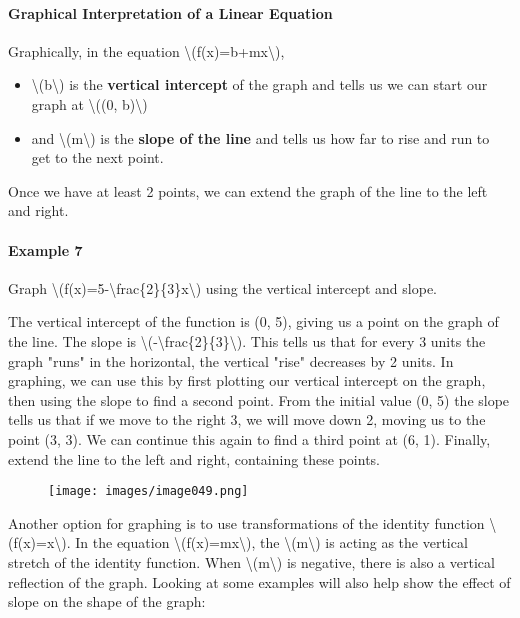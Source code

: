 \hypertarget{graphical-interpretation-of-a-linear-equation}{%
\paragraph{Graphical Interpretation of a Linear
Equation}\label{graphical-interpretation-of-a-linear-equation}}

Graphically, in the equation
\textbackslash{}(f(x)=b+mx\textbackslash{}),

\begin{itemize}
\tightlist
\item
  \textbackslash{}(b\textbackslash{}) is the \textbf{vertical intercept}
  of the graph and tells us we can start our graph at
  \textbackslash{}((0, b)\textbackslash{})
\item
  and \textbackslash{}(m\textbackslash{}) is the \textbf{slope of the
  line} and tells us how far to rise and run to get to the next point.
\end{itemize}

Once we have at least 2 points, we can extend the graph of the line to
the left and right.

\hypertarget{example-7}{%
\paragraph{Example 7}\label{example-7}}

Graph
\textbackslash{}(f(x)=5-\textbackslash{}frac\{2\}\{3\}x\textbackslash{})
using the vertical intercept and slope.

The vertical intercept of the function is (0, 5), giving us a point on
the graph of the line. The slope is
\textbackslash{}(-\textbackslash{}frac\{2\}\{3\}\textbackslash{}). This
tells us that for every 3 units the graph "runs" in the horizontal, the
vertical "rise" decreases by 2 units. In graphing, we can use this by
first plotting our vertical intercept on the graph, then using the slope
to find a second point. From the initial value (0, 5) the slope tells us
that if we move to the right 3, we will move down 2, moving us to the
point (3, 3). We can continue this again to find a third point at (6,
1). Finally, extend the line to the left and right, containing these
points.

\begin{figure}
\centering
\texttt{[image: images/image049.png]}
\caption{}
\end{figure}

Another option for graphing is to use transformations of the identity
function \textbackslash{}(f(x)=x\textbackslash{}). In the equation
\textbackslash{}(f(x)=mx\textbackslash{}), the
\textbackslash{}(m\textbackslash{}) is acting as the vertical stretch of
the identity function. When \textbackslash{}(m\textbackslash{}) is
negative, there is also a vertical reflection of the graph. Looking at
some examples will also help show the effect of slope on the shape of
the graph:

